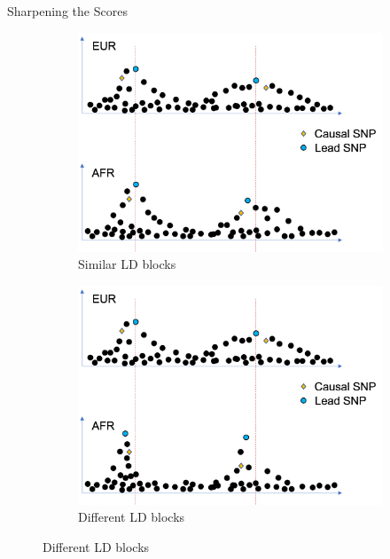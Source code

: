 \documentclass{beamer}
\begin{document}
\begin{frame}{Sharpening the Scores}
\begin{figure}
\centering
\begin{subfigure}{.5\textwidth}
  \centering
  \includegraphics[width=.8\linewidth]{images/LD_similar.png}
  \caption{Similar LD blocks}
  \label{fig:Similar LD}
\end{subfigure}%
\begin{subfigure}{.5\textwidth}
  \centering
  \includegraphics[width=.8\linewidth]{images/LD_diff.png}
  \caption{Different LD blocks}
  \label{fig:different LD}
\end{subfigure}
\label{fig:}
\end{figure}

\end{frame}
\end{document}
